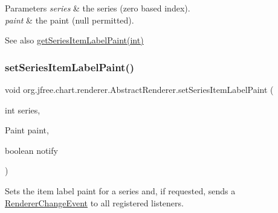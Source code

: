 \begin{DoxyParams}{Parameters}
{\em series} & the series (zero based index). \\
\hline
{\em paint} & the paint ({\ttfamily null} permitted).\\
\hline
\end{DoxyParams}
\begin{DoxySeeAlso}{See also}
\mbox{\hyperlink{classorg_1_1jfree_1_1chart_1_1renderer_1_1_abstract_renderer_a529914230c394fd2600e3aa35d529b63}{get\+Series\+Item\+Label\+Paint(int)}} 
\end{DoxySeeAlso}
\mbox{\label{classorg_1_1jfree_1_1chart_1_1renderer_1_1_abstract_renderer_ab16a17533a8e7562ecfb1229c3191536}} 
\subsubsection{\texorpdfstring{set\+Series\+Item\+Label\+Paint()}{setSeriesItemLabelPaint()}\hspace{0.1cm}{\footnotesize\ttfamily [2/2]}}
{\footnotesize\ttfamily void org.\+jfree.\+chart.\+renderer.\+Abstract\+Renderer.\+set\+Series\+Item\+Label\+Paint (\begin{DoxyParamCaption}\item[{int}]{series,  }\item[{Paint}]{paint,  }\item[{boolean}]{notify }\end{DoxyParamCaption})}

Sets the item label paint for a series and, if requested, sends a \mbox{\hyperlink{}{Renderer\+Change\+Event}} to all registered listeners.


